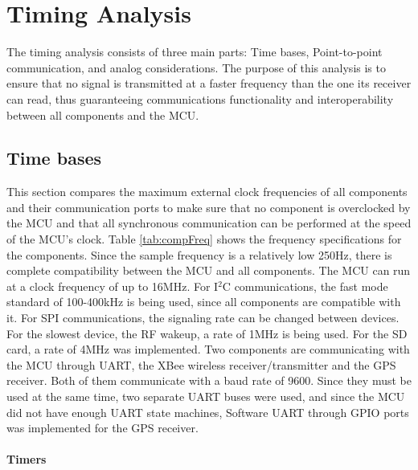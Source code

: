 \section{Timing Analysis}
The timing analysis consists of three main parts: Time bases, Point-to-point communication, and analog considerations. The purpose of this analysis is to ensure that no signal is transmitted at a faster frequency than the one its receiver can read, thus guaranteeing communications functionality and interoperability between all components and the MCU.

\subsection{Time bases}
This section compares the maximum external clock frequencies of all components and their communication ports to make sure that no component is overclocked by the MCU and that all synchronous communication can be performed at the speed of the MCU's clock. Table \ref{tab:compFreq} shows the frequency specifications for the components.  Since the sample frequency is a relatively low 250Hz, there is complete compatibility between the MCU and all components. The MCU can run at a clock frequency of up to 16MHz. For I$^2$C communications, the fast mode standard of 100-400kHz is being used, since all components are compatible with it. For SPI communications, the signaling rate can be changed between devices. For the slowest device, the RF wakeup, a rate of 1MHz is being used. For the SD card, a rate of 4MHz was implemented. Two components are communicating with the MCU through UART, the XBee wireless receiver/transmitter and the GPS receiver. Both of them communicate with a baud rate of 9600. Since they must be used at the same time, two separate UART buses were used, and since the MCU did not have enough UART state machines, Software UART through GPIO ports was implemented for the GPS receiver.

\paragraph{Timers}

